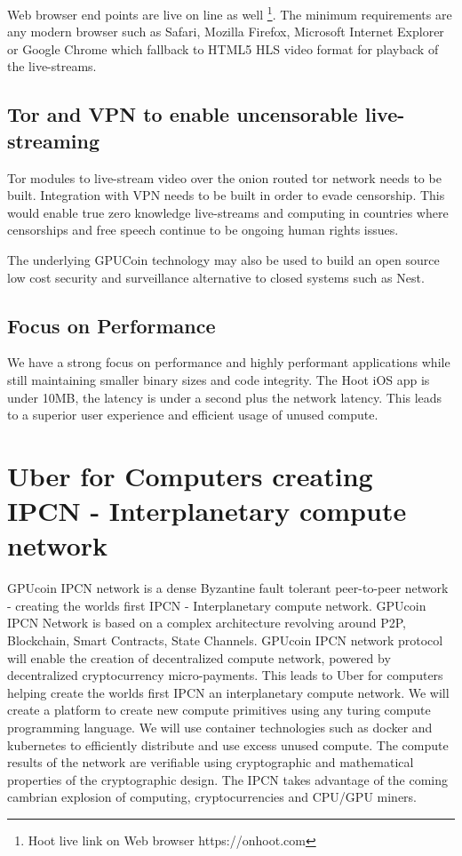 \documentclass{article}
\begin{document}
Web browser end points are live on line as well
\footnote{Hoot live link on Web browser https://onhoot.com}. The minimum requirements are any modern
browser such as Safari, Mozilla Firefox, Microsoft Internet Explorer or Google Chrome which fallback to HTML5 HLS video format for playback
of the live-streams.

\subsection{Tor and VPN to enable uncensorable live-streaming }
Tor modules to live-stream video over the onion routed tor network needs to be built. Integration with VPN needs to be built in order to evade censorship. This would enable true zero knowledge live-streams and computing in countries where censorships and free speech continue to be ongoing human rights issues.

The underlying GPUCoin technology may also be used to build an open source low cost security and surveillance alternative to closed systems such as Nest.

\subsection{Focus on Performance}
We have a strong focus on performance and highly performant applications while still maintaining smaller binary sizes and code integrity. The Hoot iOS app is under 10MB, the latency is under a second plus the network latency. This leads to a superior user experience and efficient usage of unused compute.

\section{Uber for Computers creating IPCN - Interplanetary compute network}
GPUcoin IPCN network is a dense Byzantine fault tolerant peer-to-peer network - creating the worlds first IPCN - Interplanetary compute network. GPUcoin IPCN Network is based on a complex architecture revolving around P2P, Blockchain, Smart Contracts, State Channels. GPUcoin IPCN network protocol will enable the creation of decentralized compute network, powered by decentralized cryptocurrency micro-payments. This leads to Uber for computers helping create the worlds first IPCN an interplanetary compute network. We will create a platform to create new compute primitives using any turing compute programming language. We will use container technologies such as docker and kubernetes to efficiently distribute and use excess unused compute. The compute results of the network are verifiable using cryptographic and mathematical properties of the cryptographic design. The IPCN takes advantage of the coming cambrian explosion of computing, cryptocurrencies and CPU/GPU miners.
\end{document}
